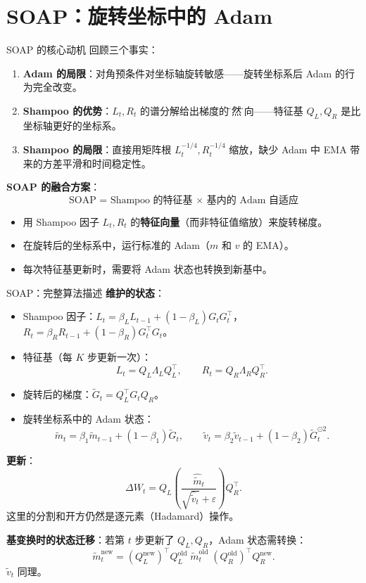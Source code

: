 \documentclass[aspectratio=169,10pt]{ctexbeamer}
\newcommand{\eps}{\varepsilon}
\begin{document}
\section{SOAP：旋转坐标中的 Adam}

\begin{frame}{SOAP 的核心动机}
回顾三个事实：
\begin{enumerate}
  \item \textbf{Adam 的局限}：对角预条件对坐标轴旋转敏感——旋转坐标系后 Adam 的行为完全改变。
  \item \textbf{Shampoo 的优势}：$L_t,R_t$ 的谱分解给出梯度的\"自然\"方向——特征基 $Q_L,Q_R$ 是比坐标轴更好的坐标系。
  \item \textbf{Shampoo 的局限}：直接用矩阵根 $L_t^{-1/4},R_t^{-1/4}$ 缩放，缺少 Adam 中 EMA 带来的方差平滑和时间稳定性。
\end{enumerate}

\vspace{.25cm}
\textbf{SOAP 的融合方案}：
\[
  \boxed{\text{SOAP = Shampoo 的特征基 $\times$ 基内的 Adam 自适应}}
\]

\vspace{.25cm}
\begin{itemize}
  \item 用 Shampoo 因子 $L_t,R_t$ 的\textbf{特征向量}（而非特征值缩放）来旋转梯度。
  \item 在旋转后的坐标系中，运行标准的 Adam（$m$ 和 $v$ 的 EMA）。
  \item 每次特征基更新时，需要将 Adam 状态也转换到新基中。
\end{itemize}
\end{frame}

\begin{frame}{SOAP：完整算法描述}
\textbf{维护的状态}：
\begin{itemize}
  \item Shampoo 因子：$L_t=\beta_L L_{t-1}+(1-\beta_L)G_t G_t^\top$，$R_t=\beta_R R_{t-1}+(1-\beta_R)G_t^\top G_t$。
  \item 特征基（每 $K$ 步更新一次）：
  \[
    L_t=Q_L\Lambda_L Q_L^\top,\qquad R_t=Q_R\Lambda_R Q_R^\top.
  \]
  \item 旋转后的梯度：$\tilde G_t=Q_L^\top G_t Q_R$。
  \item 旋转坐标系中的 Adam 状态：
  \[
    \tilde m_t=\beta_1\tilde m_{t-1}+(1-\beta_1)\tilde G_t,\qquad
    \tilde v_t=\beta_2\tilde v_{t-1}+(1-\beta_2)\tilde G_t^{\odot2}.
  \]
\end{itemize}

\vspace{.2cm}
\textbf{更新}：
\[
  \Delta W_t=Q_L\left(\frac{\hat{\tilde m}_t}{\sqrt{\hat{\tilde v}_t}+\eps}\right)Q_R^\top.
\]
这里的分割和开方仍然是逐元素（Hadamard）操作。

\vspace{.2cm}
\textbf{基变换时的状态迁移}：若第 $t$ 步更新了 $Q_L,Q_R$，Adam 状态需转换：
\[
  \tilde m_t^{\text{new}}=(Q_L^{\text{new}})^\top Q_L^{\text{old}}\;\tilde m_t^{\text{old}}\;(Q_R^{\text{old}})^\top Q_R^{\text{new}}.
\]
$\tilde v_t$ 同理。
\end{frame}
\end{document}
